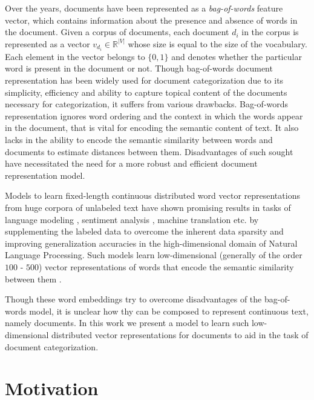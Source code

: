 Over the years, documents have been represented as a \emph{bag-of-words} feature vector, which contains information about the presence and absence of words in the document. Given a corpus of documents, each document $d_{i}$ in the corpus is represented as a vector $v_{d_{i}} \in \mathbb{R}^{|V|}$ whose size is equal to the size of the vocabulary. Each element in the vector belongs to $\{0, 1\}$ and denotes whether the particular word is present in the document or not. Though bag-of-words document representation has been widely used for document categorization due to its simplicity, efficiency and ability to capture topical content of the documents necessary for categorization, it suffers from various drawbacks. Bag-of-words representation ignores word ordering and the context in which the words appear in the document, that is vital for encoding the semantic content of text. It also lacks in the ability to encode the semantic similarity between words and documents to estimate distances between them. Disadvantages of such sought have necessitated the need for a more robust and efficient document representation model.

Models to learn fixed-length continuous distributed word vector representations from huge corpora of unlabeled text have shown promising results in tasks of language modeling \cite{bengio2003neural}, sentiment analysis \cite{socher2013recursive}, machine translation \cite{zou2013bilingual} etc. by supplementing the labeled data to overcome the inherent data sparsity and improving generalization accuracies in the high-dimensional domain of Natural Language Processing. Such models learn low-dimensional (generally of the order $100$ - $500$) vector representations of words that encode the semantic similarity between them \citep{mikolov2013efficient}. 

Though these word embeddings try to overcome disadvantages of the bag-of-words model, it is unclear how thy can be composed to represent continuous text, namely documents. In this work we present a model to learn such low-dimensional distributed vector representations for documents to aid in the task of document categorization.
 
\section{Motivation}

